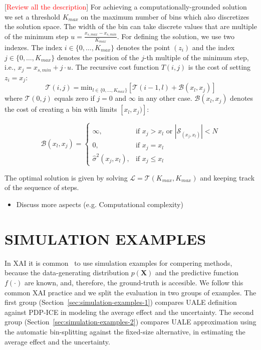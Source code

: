 \documentclass[twoside]{article}
\newcommand{\todo}[1]{[\textcolor{red}{#1}]}
\begin{document}
\todo{Review all the description}
For achieving a computationally-grounded solution we set a threshold
\(K_{max}\) on the maximum number of bins which also discretizes the
solution space. The width of the bin can take discrete values that are
multiple of the minimum step
\(u = \frac{x_{s, max} - x_{s, min}}{K_{max}}\). For defining the
solution, we use two indexes. The index
\(i \in \{0, \ldots, K_{max}\}\) denotes the point \((z_i)\) and the
index \(j \in \{0, \ldots, K_{max}\} \) denotes the position of the
\(j\)-th multiple of the minimum step, i.e., 
\(x_j = x_{s,min} + j \cdot u\). The recursive cost function
\(T(i,j)\) is the cost of setting \(z_i=x_j\):
\begin{equation}
  \label{eq:recursive_cost}
  \mathcal{T}(i,j) = \mathrm{min}_{l \in \{0, \ldots, K_{max}\}} \left [ \mathcal{T}(i-1, l) + \mathcal{B}(x_l, x_j) \right ]
\end{equation}
%
where \(\mathcal{T}(0,j)\) equals zero if \(j=0\) and \(\infty\) in
any other case. \(\mathcal{B}(x_l, x_j)\) denotes the cost of creating a bin
with limits \([x_l, x_j)]\):

\begin{equation}
  \label{eq:cost_step}
  \mathcal{B}(x_l, x_j) = \begin{cases}
                            \infty, & \text{if $x_j > x_l$ or \(|\mathcal{S}_{(x_j, x_l)}| < N\)}\\
                            0, & \text{if $x_j = x_l$}\\
                            \hat{\sigma}^2(x_j, x_l), &\text{if $x_j \leq x_l$}
  \end{cases}
\end{equation}

The optimal solution is given by solving
\(\mathcal{L} = \mathcal{T}(K_{max}, K_{max})\) and keeping track of the sequence of
steps. 

\noindent

\begin{itemize}
\item Discuss more aspects (e.g. Computational complexity)
\end{itemize}

\section{SIMULATION EXAMPLES}
\label{sec:simulation-examples}

In XAI it is common~\citep{aas2021explaining, herbinger2022repid} to
use simulation examples for compering methods, because the
data-generating distribution \(p(\mathbf{X})\) and the predictive
function \(f(\cdot)\) are known, and, therefore, the ground-truth is
accesible. We follow this common XAI practice and we split the
evaluation in two groups of examples. The first group
(Section~\ref{sec:simulation-examples-1}) compares UALE definition
against PDP-ICE in modeling the average effect and the
uncertainty. The second group
(Section~\ref{sec:simulation-examples-2}) compares UALE approximation
using the automatic bin-splitting against the fixed-size alternative,
in estimating the average effect and the uncertainty. 
\end{document}
